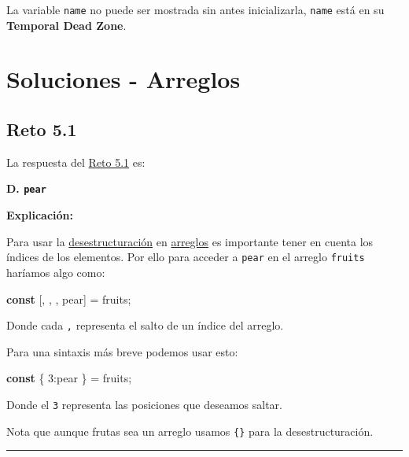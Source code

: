\documentclass[
  letterpaper,
  DIV=11,
  numbers=noendperiod]{scrreprt}
\newenvironment{Shaded}{\begin{snugshade}}{\end{snugshade}}
\newcommand{\DecValTok}[1]{\textcolor[rgb]{0.68,0.00,0.00}{#1}}
\newcommand{\KeywordTok}[1]{\textcolor[rgb]{0.00,0.23,0.31}{\textbf{#1}}}
\newcommand{\NormalTok}[1]{\textcolor[rgb]{0.00,0.23,0.31}{#1}}
\newcommand{\OperatorTok}[1]{\textcolor[rgb]{0.37,0.37,0.37}{#1}}
\begin{document}
La variable \texttt{name} no puede ser mostrada sin antes inicializarla,
\texttt{name} está en su \textbf{Temporal Dead Zone}.

\chapter{Soluciones - Arreglos}\label{soluciones---arreglos}

\section{Reto 5.1}\label{sec-sol-cap5-reto1}

La respuesta del \hyperref[sec-cap5-reto1]{Reto 5.1} es:

\textbf{D. \texttt{pear}}

\textbf{Explicación:}

Para usar la \hyperref[glos-desestructuraciuxf3n]{desestructuración} en
\hyperref[glos-arreglo]{arreglos} es importante tener en cuenta los
índices de los elementos. Por ello para acceder a \texttt{pear} en el
arreglo \texttt{fruits} haríamos algo como:

\begin{Shaded}
\begin{Highlighting}[]
\KeywordTok{const}\NormalTok{ [}\OperatorTok{,} \OperatorTok{,} \OperatorTok{,}\NormalTok{ pear]  }\OperatorTok{=}\NormalTok{ fruits}\OperatorTok{;}
\end{Highlighting}
\end{Shaded}

Donde cada \texttt{,} representa el salto de un índice del arreglo.

Para una sintaxis más breve podemos usar esto:

\begin{Shaded}
\begin{Highlighting}[]
\KeywordTok{const}\NormalTok{ \{ }\DecValTok{3}\OperatorTok{:}\NormalTok{pear \} }\OperatorTok{=}\NormalTok{ fruits}\OperatorTok{;}
\end{Highlighting}
\end{Shaded}

Donde el \texttt{3} representa las posiciones que deseamos saltar.

Nota que aunque frutas sea un arreglo usamos \texttt{\{\}} para la
desestructuración.

\begin{center}\rule{0.5\linewidth}{0.5pt}\end{center}
\end{document}
